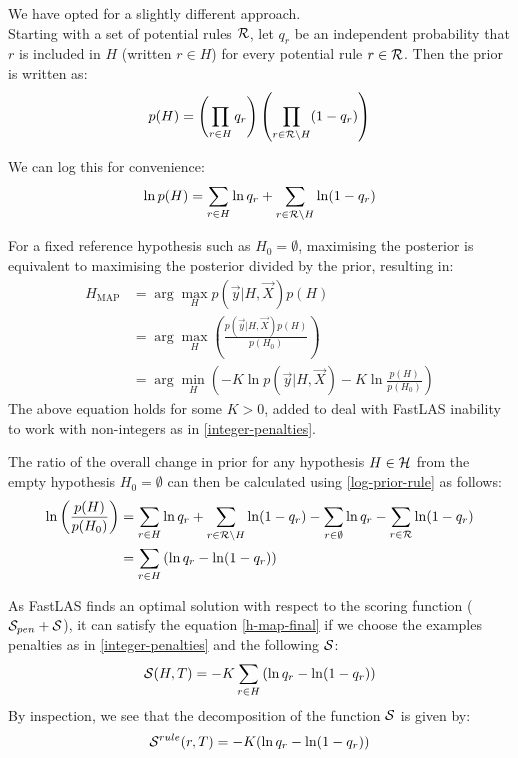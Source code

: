 We have opted for a slightly different approach. \\
Starting with a set of potential rules $\mathcal{R}$, let $q_r$ be an independent probability that $r$ is included in $H$ (written $r \in H$) for every potential rule $r \in \mathcal{R}$. Then the prior is written as:
\begin{align}
p(H) = \left(\prod_{r \in H} q_r\right)\left(\prod_{r \in \mathcal{R}\setminus H} (1-q_r)\right)
\end{align}

We can log this for convenience:
\begin{align}
\ln p(H) = \sum_{r \in H} \ln q_r + \sum_{r \in \mathcal{R}\setminus H} \ln(1-q_r) \label{log-prior-rule}
\end{align}


For a fixed reference hypothesis such as $H_0 = \emptyset$, maximising the posterior is equivalent to maximising the posterior divided by the prior, resulting in:
\begin{align}
H_{\text{MAP}}
& = \arg\max_{H} p(\vec{y}|H, \vec{X}) p(H)  \nonumber \\
& = \arg\max_{H} \left(\frac{ p(\vec{y}|H, \vec{X}) p(H)}{p(H_0)}\right)  \nonumber \\
& = \arg\min_{H} \left( -K\ln p(\vec{y}|H, \vec{X}) - K \ln \frac{p(H)}{p(H_0)}\right) \label{h-map-final}
\end{align}
The above equation holds for some $K > 0$, added to deal with FastLAS inability to work with non-integers as in \ref{integer-penalties}.

The ratio of the overall change in prior for any hypothesis $H \in \mathcal{H}$ from the empty hypothesis $H_0 = \emptyset$ can then be calculated using \ref{log-prior-rule} as follows:
\begin{align}
\ln \left(\frac{p(H)}{p(H_0)}\right) 
& = \sum_{r \in H} \ln q_r + \sum_{r \in \mathcal{R}\setminus H} \ln(1-q_r) \nonumber
- \sum_{r \in \emptyset} \ln q_r - \sum_{r \in \mathcal{R}} \ln(1-q_r) \\
& = \sum_{r \in H} \left(\ln q_r - \ln(1-q_r) \right)
\end{align}

As FastLAS finds an optimal solution with respect to the scoring function ($\mathcal{S}_{pen} + \mathcal{S}$), it can satisfy the equation \ref{h-map-final} if we choose the examples penalties as in \ref{integer-penalties} and the following $\mathcal{S}$:
\begin{align}
    \mathcal{S}(H, T) =  -K \sum_{r \in H} \left(\ln q_r - \ln(1-q_r) \right)
\end{align}
By inspection, we see that the decomposition of the function $\mathcal{S}$ is given by:
\begin{align}
    \mathcal{S}^{rule}(r, T) = -K (\ln q_r - \ln(1-q_r))
\end{align}


